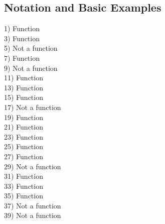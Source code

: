 \documentclass[11pt]{book}
\theoremstyle{definition}  %
\begin{document}

\subsection*{Notation and Basic Examples}                                

\begin{multicols}{2}
1) Function\\
3) Function\\
5) Not a function\\
7) Function\\
9) Not a function\\
11) Function\\
13) Function\\
15) Function\\
17) Not a function\\
19) Function\\
21) Function\\
23) Function\\
25) Function\\
27) Function\\
29) Not a function\\
31) Function\\
33) Function\\
35) Function\\
37) Not a function\\
39) Not a function
\end{multicols}
\end{document}
